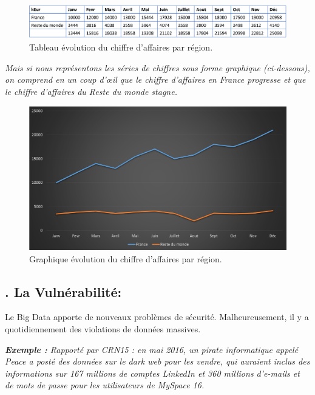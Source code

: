 \begin{figure}[h]
	\centering
	\includegraphics[scale=0.4]{img/1.4}
	\caption{Tableau évolution du chiffre d'affaires par région.}
\end{figure}

\textit{Mais si nous représentons les séries de chiffres sous forme graphique (ci-dessous), on comprend en un coup d'œil que le chiffre d'affaires en France progresse et que le chiffre d'affaires du Reste du monde stagne.}

\begin{figure}[h]
	\centering
	\includegraphics[scale=0.5]{img/1.5}
	\caption{Graphique évolution du chiffre d'affaires par région.}
\end{figure}

\subsection*{. La Vulnérabilité:}
Le Big Data apporte de nouveaux problèmes de sécurité. Malheureusement, il y a quotidiennement des violations de données massives.

\textit{\textbf{Exemple :} Rapporté par CRN15 : en mai 2016, un pirate informatique appelé Peace a posté des données sur le dark web pour les vendre, qui auraient inclus des informations sur 167 millions de comptes LinkedIn et 360 millions d'e-mails et de mots de passe pour les utilisateurs de MySpace 16.}

